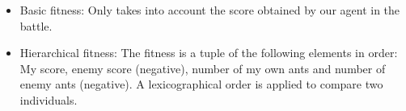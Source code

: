 \documentclass[runningheads]{llncs}
\begin{document}
\begin{itemize}
\item Basic fitness: Only takes into account the score obtained by our agent in the battle.
\item Hierarchical fitness: The fitness is a tuple of the following elements in order: My score, enemy score (negative), number of my own ants and number of enemy ants (negative). A lexicographical order is applied to compare two individuals.

\end{itemize}


 
\end{document}

